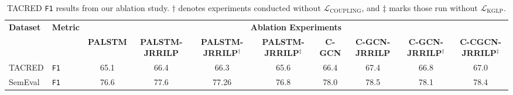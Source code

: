 \begin{table*}[ht]
\centering
\tiny
\begin{tabular}{llcccc|cccc}
\toprule
\multirow{2}{*}{\textbf{Dataset}} & \multirow{2}{*}{\textbf{Metric}} & \multicolumn{8}{c}{\textbf{Ablation Experiments}} \\
\cmidrule{3-10}
& &  \textbf{PALSTM} & \textbf{PALSTM-JRRILP} & \textbf{PALSTM-JRRILP$^	\dagger$} & \textbf{PALSTM-JRRILP$^	\ddagger$} & \textbf{C-GCN} & \textbf{C-GCN-JRRILP} & \textbf{C-GCN-JRRILP$^\dagger$} & \textbf{C-CGCN-JRRILP$^\ddagger$}\\
\midrule
TACRED & \texttt{F1} & 65.1 & 66.4 & 66.3 & 65.6 & 66.4 & 67.4 & 66.8 & 67.0  \\
SemEval & \texttt{F1} & 76.6 & 77.6 & 77.26 & 76.8 & 78.0 & 78.5 & 78.1 & 78.4 \\

\bottomrule
\end{tabular}
\caption{TACRED \texttt{F1} results from our ablation study. $\dagger$ denotes experiments conducted without $\mathcal{L}_\text{COUPLING}$, and $\ddagger$ marks those run without $\mathcal{L}_{\text{KGLP}}$. \\}
\label{tab:ablation_tests}
\end{table*}